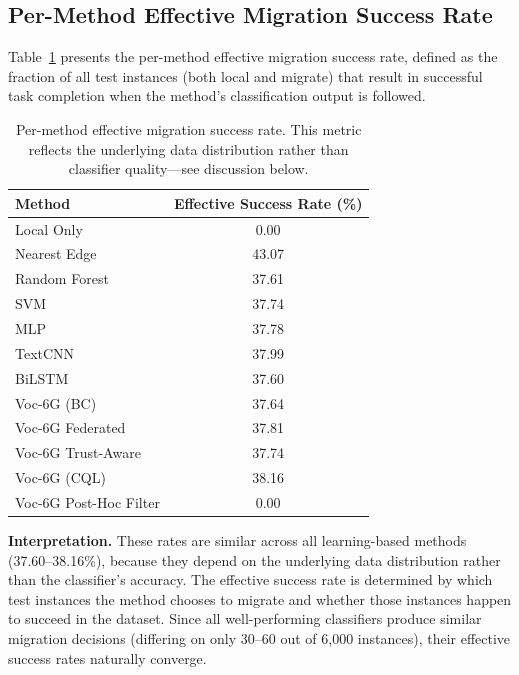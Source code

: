 \documentclass[10pt,letterpaper]{article}
\begin{document}
\subsection*{Per-Method Effective Migration Success Rate}

Table~\ref{tab:success_rates} presents the per-method effective migration success rate, defined as the fraction of all test instances (both local and migrate) that result in successful task completion when the method's classification output is followed.

\begin{table}[t]
\centering
\caption{Per-method effective migration success rate. This metric reflects the underlying data distribution rather than classifier quality---see discussion below.}
\label{tab:success_rates}
\small
\begin{tabular}{lc}
\toprule
\textbf{Method} & \textbf{Effective Success Rate (\%)} \\
\midrule
Local Only              & 0.00 \\
Nearest Edge            & 43.07 \\
Random Forest           & 37.61 \\
SVM                     & 37.74 \\
MLP                     & 37.78 \\
TextCNN                 & 37.99 \\
BiLSTM                  & 37.60 \\
Voc-6G (BC)             & 37.64 \\
Voc-6G Federated        & 37.81 \\
Voc-6G Trust-Aware      & 37.74 \\
Voc-6G (CQL)            & 38.16 \\
Voc-6G Post-Hoc Filter  & 0.00 \\
\bottomrule
\end{tabular}
\end{table}

\textbf{Interpretation.} These rates are similar across all learning-based methods (37.60--38.16\%), because they depend on the underlying data distribution rather than the classifier's accuracy. The effective success rate is determined by which test instances the method chooses to migrate and whether those instances happen to succeed in the dataset. Since all well-performing classifiers produce similar migration decisions (differing on only 30--60 out of 6,000 instances), their effective success rates naturally converge.
\end{document}
